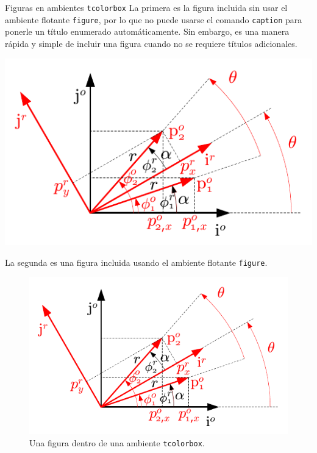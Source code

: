 \documentclass[11pt,letterpaper,twoside]{report}%
\begin{document}
\begin{center}
\begin{defbox}{Figuras en ambientes \texttt{tcolorbox}}
La primera es la figura incluida sin usar el ambiente flotante \texttt{figure}, por lo que no puede usarse el comando \texttt{caption} para ponerle un título enumerado automáticamente.  Sin embargo, es una manera rápida y simple de incluir una figura cuando no se requiere títulos adicionales.

\begin{center}
\includegraphics[scale=1.0]{figs/prueba.pdf}
\end{center}

La segunda es una figura incluida usando el ambiente flotante \texttt{figure}.

\begin{figure}[H]
\centering
\includegraphics[scale=1.0]{figs/prueba.pdf}
\vspace*{-1.0\baselineskip}
\caption{Una figura dentro de una ambiente \texttt{tcolorbox}.}
\end{figure}

\end{defbox}
\end{center}
\end{document}

